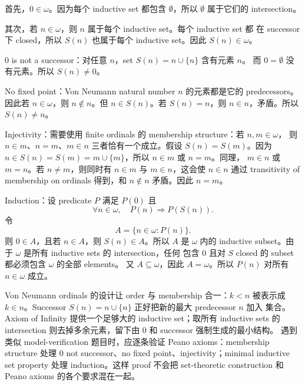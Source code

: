\begin{solution}
首先，\(0\in\omega\)。因为每个 inductive set 都包含 \(\emptyset\)，所以
\(\emptyset\) 属于它们的 intersection。

其次，若 \(n\in\omega\)，则 \(n\) 属于每个 inductive set。每个 inductive set 都
在 successor 下 closed，所以 \(S(n)\) 也属于每个 inductive set。因此
\(S(n)\in\omega\)。

\(0\) is not a successor：对任意 \(n\)，set \(S(n)=n\cup\{n\}\) 含有元素 \(n\)。
而 \(0=\emptyset\) 没有元素。所以 \(S(n)\neq0\)。

No fixed point：Von Neumann natural number \(n\) 的元素都是它的 predecessors。
因此若 \(n\in\omega\)，则 \(n\notin n\)。但 \(n\in S(n)\)。若 \(S(n)=n\)，则
\(n\in n\)，矛盾。所以 \(S(n)\neq n\)。

Injectivity：需要使用 finite ordinals 的 membership structure：若 \(n,m\in\omega\)，
则 \(n\in m\)、\(n=m\)、\(m\in n\) 三者恰有一个成立。假设 \(S(n)=S(m)\)。因为
\(n\in S(n)=S(m)=m\cup\{m\}\)，所以 \(n\in m\) 或 \(n=m\)。同理，
\(m\in n\) 或 \(m=n\)。若 \(n\neq m\)，则同时有 \(n\in m\) 与 \(m\in n\)，这会使
\(n\in n\) 通过 transitivity of membership on ordinals 得到，和 \(n\notin n\)
矛盾。因此 \(n=m\)。

Induction：设 predicate \(P\) 满足 \(P(0)\) 且
\[
  \forall n\in\omega,\quad P(n)\Rightarrow P(S(n)).
\]
令
\[
  A=\{n\in\omega:P(n)\}.
\]
则 \(0\in A\)，且若 \(n\in A\)，则 \(S(n)\in A\)。所以 \(A\) 是 \(\omega\) 内的
inductive subset。由于 \(\omega\) 是所有 inductive sets 的 intersection，任何
包含 \(0\) 且对 \(S\) closed 的 subset 都必须包含 \(\omega\) 的全部 elements。
又 \(A\subseteq\omega\)，因此 \(A=\omega\)。所以 \(P(n)\) 对所有
\(n\in\omega\) 成立。
\end{solution}

\begin{explanation}
Von Neumann ordinals 的设计让 order 与 membership 合一：\(k<n\) 被表示成
\(k\in n\)。Successor \(S(n)=n\cup\{n\}\) 正好把新的最大 predecessor \(n\) 加入
集合。Axiom of Infinity 提供一个足够大的 inductive set；取所有 inductive sets
的 intersection 则去掉多余元素，留下由 \(0\) 和 successor 强制生成的最小结构。
遇到类似 model-verification 题目时，应逐条验证 Peano axioms：membership structure
处理 \(0\) not successor、no fixed point、injectivity；minimal inductive set
property 处理 induction。这样 proof 不会把 set-theoretic construction 和 Peano
axioms 的各个要求混在一起。
\end{explanation}

